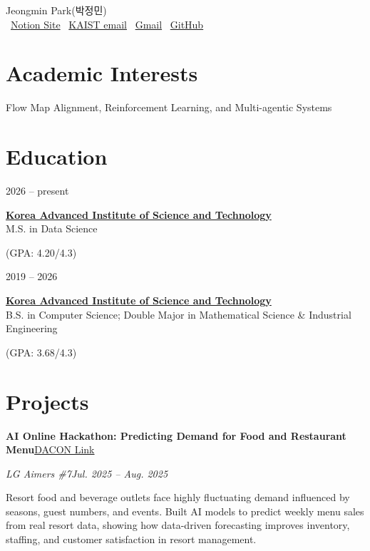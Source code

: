 \documentclass[11pt,a4paper]{article}
\newcommand{\entry}[4]{%
  \vspace{4pt}%
  {\bfseries #1}\hfill{#2}\par
  \vspace{1pt}%
  {\itshape #3}\hfill{\itshape #4}\par
  \vspace{2pt}%
}
\newcommand{\edu}[4]{%
  \begin{minipage}[t]{0.16\textwidth}#1\end{minipage}%
  \begin{minipage}[t]{0.62\textwidth}\raggedright\textbf{#2}\\ #3\end{minipage}%
  \hfill
  \begin{minipage}[t]{0.20\textwidth}\raggedleft #4\end{minipage}%
  \par\vspace{6pt}%
}
\begin{document}
\begin{center}
  {\Huge Jeongmin Park(박정민)}\\[6pt]
  \faGlobe~\href{https://www.notion.so/}{Notion Site}          %
  \quad\textbar\quad
  \faEnvelope~\href{mailto:pjmin831@kaist.ac.kr}{KAIST email}
  \quad\textbar\quad
  \faEnvelope~\href{mailto:your.gmail@gmail.com}{Gmail}        %
  \quad\textbar\quad
  \faGithub~\href{https://github.com/jinnessism}{GitHub}
\end{center}

\section{Academic Interests}
Flow Map Alignment, Reinforcement Learning, and Multi-agentic Systems

\section{Education}
\edu{2026 -- present}
    {\href{https://gsds.kaist.ac.kr/}{Korea Advanced Institute of Science and Technology}}
    {M.S. in Data Science}
    {(GPA: 4.20/4.3)}                                           
\edu{2019 -- 2026}
    {\href{https://www.kaist.ac.kr/}{Korea Advanced Institute of Science and Technology}}
    {B.S. in Computer Science; Double Major in Mathematical Science \& Industrial Engineering}
    {(GPA: 3.68/4.3)}                                           

\section{Projects}

\entry{AI Online Hackathon: Predicting Demand for Food and Restaurant Menu}
      {\href{https://dacon.io/competitions/official/236559/overview/description}{DACON Link}}                    %
      {LG Aimers \#7}{Jul. 2025 -- Aug. 2025}
Resort food and beverage outlets face highly fluctuating demand influenced by
seasons, guest numbers, and events. Built AI models to predict weekly menu sales
from real resort data, showing how data-driven forecasting improves inventory,
staffing, and customer satisfaction in resort management.
\end{document}
